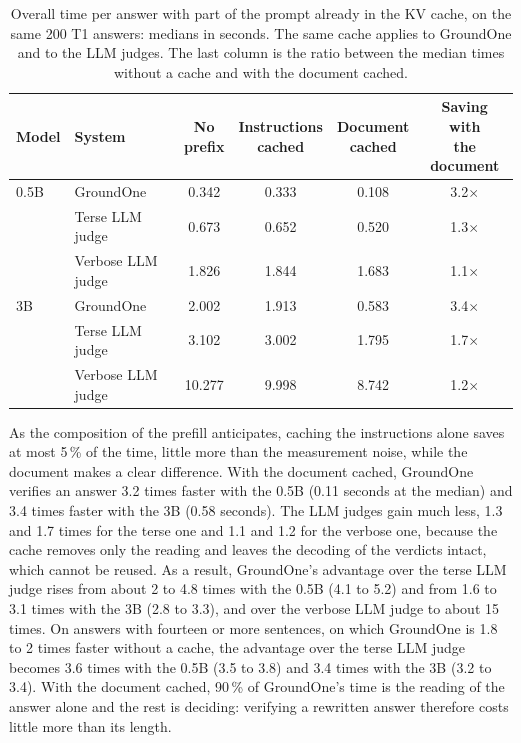 \begin{table}[htbp]
\centering
\caption{Overall time per answer with part of the prompt already in the KV cache, on the same 200 T1 answers: medians
in seconds. The same cache applies to GroundOne and to the LLM judges. The last column is the ratio between the median
times without a cache and with the document cached.}
\label{tab:results-prefix-cache}
\small
\setlength{\tabcolsep}{4pt}
\begin{tabular}{llcccc}
\toprule
Model & System & \makecell{No\\prefix} & \makecell{Instructions\\cached} & \makecell{Document\\cached} & \makecell{Saving with\\the document} \\
\midrule
0.5B & GroundOne & 0.342 & 0.333 & 0.108 & 3.2$\times$ \\
 & Terse LLM judge & 0.673 & 0.652 & 0.520 & 1.3$\times$ \\
 & Verbose LLM judge & 1.826 & 1.844 & 1.683 & 1.1$\times$ \\
\midrule
3B & GroundOne & 2.002 & 1.913 & 0.583 & 3.4$\times$ \\
 & Terse LLM judge & 3.102 & 3.002 & 1.795 & 1.7$\times$ \\
 & Verbose LLM judge & 10.277 & 9.998 & 8.742 & 1.2$\times$ \\
\bottomrule
\end{tabular}
\end{table}

As the composition of the prefill anticipates, caching the instructions alone saves at most 5\,\% of the time, little more
than the measurement noise, while the document makes a clear difference. With the document
cached, GroundOne verifies an answer 3.2 times faster with the 0.5B (0.11 seconds at the median) and 3.4 times faster
with the 3B (0.58 seconds). The LLM judges gain much less, 1.3 and 1.7 times for the terse one and 1.1 and 1.2 for the
verbose one, because the cache removes only the reading and leaves the decoding of the verdicts intact, which cannot be
reused. As a result, GroundOne's advantage over the terse LLM judge rises from about 2 to 4.8 times with the 0.5B (4.1
to 5.2) and from 1.6 to 3.1 times with the 3B (2.8 to 3.3), and over the verbose LLM judge to about 15 times. On answers with fourteen or more sentences, on which GroundOne is 1.8 to 2 times faster without a cache, the advantage over the terse LLM judge becomes 3.6 times with the 0.5B (3.5 to 3.8) and 3.4 times with the 3B (3.2 to 3.4). With the
document cached, 90\,\% of GroundOne's time is the reading of the answer alone and the rest is deciding: verifying a
rewritten answer therefore costs little more than its length.

